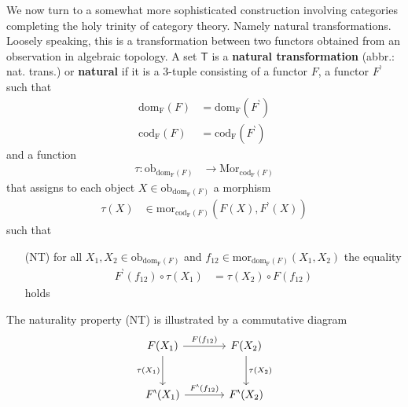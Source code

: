 We now turn to a somewhat more sophisticated construction involving categories completing the holy trinity of category theory. Namely natural transformations. Loosely speaking, this is a transformation between two functors obtained from an observation in algebraic topology. A set $\mathsf{T}$ is a \textbf{natural transformation} (abbr.: nat. trans.) or \textbf{natural} if it is a $3$-tuple consisting of a functor $F$, a functor $F^{\backprime}$ such that
\begin{align*}
  \mathrm{dom_{F}}(F)
  &=
  \mathrm{dom_{F}}(F^{\backprime})
  \\
  \mathrm{cod_{F}}(F)
  &=
  \mathrm{cod_{F}}(F^{\backprime})
\end{align*}
and a function
\begin{align*}
  \tau
  \colon
  \mathrm{ob}_{\mathrm{dom_{F}}(F)}
  &\rightarrow
  \mathrm{Mor}_{\mathrm{cod_{F}}(F)}
\end{align*}
that assigns to each object $X \in \mathrm{ob}_{\mathrm{dom_{F}}(F)}$ a morphism
\begin{align*}
  \tau(X)
  &\in
  \mathrm{mor}_{\mathrm{cod_{F}}(F)}(F(X),F^{\backprime}(X))
\end{align*}
such that
\begin{enumerate}
\item[(NT)]
for all $X_{1},X_{2} \in \mathrm{ob}_{\mathrm{dom_{F}}(F)}$ and $f_{12} \in \mathrm{mor}_{\mathrm{dom_{F}}(F)}(X_{1},X_{2})$ the equality
\begin{align*}
  F^{\backprime}(f_{12})
  \circ
  \tau(X_{1})
  &=
  \tau(X_{2})
  \circ
  F(f_{12})
\end{align*}
holds
\end{enumerate}
The naturality property (NT) is illustrated by a commutative diagram
\[
\begin{tikzcd}[sep=large]
  F(X_{1})
  \arrow{r}{F(f_{12})}
  \arrow[swap]{d}{\tau(X_{1})}
  &
  F(X_{2})
  \arrow{d}{\tau(X_{2})}
  \\
  F^{\backprime}(X_{1})
  \arrow{r}{F^{\backprime}(f_{12})}
  &
  F^{\backprime}(X_{2})
\end{tikzcd}
\]
